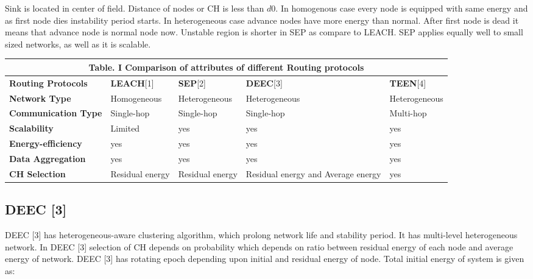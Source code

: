 \documentclass[10pt, conference, compsocconf]{IEEEtran}
\begin{document}
Sink is located in center of field. Distance of nodes or CH is less than $d0$. In homogenous case every node is equipped with same energy and as first node dies instability period starts. In heterogeneous case advance nodes have more energy than normal. After first node is dead it means that advance node is normal node now. Unstable region is shorter in SEP as compare to LEACH. SEP applies equally well to small sized networks, as well as it is scalable.


\begin{table*}[ht]
 \centering
\begin{tabular}{| p{3cm} || p{2.5cm} || p{2.5cm} || p{2.5cm} || p{2.5cm} |}
  \multicolumn{5}{c}{Table. I Comparison of attributes of different Routing protocols }\\
  \hline
  \textbf{Routing Protocols}     &\textbf{LEACH}[1] &\textbf{SEP}[2]&\textbf{DEEC}[3]  & \textbf{TEEN}[4]  \\ \hline \hline
  \textbf{Network Type }         & Homogeneous      & Heterogeneous & Heterogeneous    & Heterogeneous \\ \hline
  \textbf{Communication Type}    &   Single-hop     & Single-hop    & Single-hop       & Multi-hop  \\ \hline
  \textbf{Scalability}           &	Limited         &  yes          & yes              &  yes       \\ \hline
  \textbf{Energy-efficiency}	 &  yes             & yes           & yes              &  yes        \\ \hline
  \textbf{Data Aggregation}      &  yes             & yes           & yes              & yes          \\ \hline
  \textbf{CH Selection}&  Residual energy & Residual energy& Residual energy and Average energy  & yes\\ \hline


\end{tabular}
\end{table*}

\subsection{DEEC [3]}
DEEC [3] has heterogeneous-aware clustering algorithm, which prolong network life and stability period. It has multi-level heterogeneous network. In DEEC [3] selection of CH depends on probability which depends on ratio between residual energy of each node and average energy of network. DEEC [3] has rotating epoch depending upon initial and residual energy of node. Total initial energy of system is given as:
\end{document}
